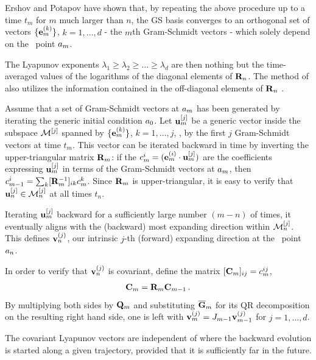 Ershov and Potapov
have shown that, by repeating the above
procedure up to a time $t_m$ for $m$ much larger than $n$,
the GS basis converges to an orthogonal set of vectors
$\{{\bf e}_m^{(k)}\}$, $k=1,\ldots, d$ - the $m$th Gram-Schmidt
vectors - which solely depend on the \statesp\ point
$a_{m}$.

The Lyapunov exponents $\lambda_1 \geq \lambda_2 \geq \ldots \geq \lambda_d$
are then nothing but the time-averaged values of the
logarithms of the diagonal elements of ${\bf R}_n$.
The method of  also utilizes the
information contained in the off-diagonal elements of ${\bf R}_n$ .

Assume that a set of Gram-Schmidt vectors at $a_m$ has
been generated by iterating the generic initial condition
$a_0$. Let ${\bf u}_m^{[j]}$ be a generic vector inside
the subspace ${\cal M}^{[j]}$ spanned by $\{{\bf e}_m^{(k)}\}$,
$k=1,\ldots, j$, \ie, by the first $j$ Gram-Schmidt vectors
at time $t_m$. This vector can be iterated backward in time
by inverting the upper-triangular matrix ${\bf R}_m$: if the
$c_m^{i}=({\bf e}_m^{(i)} \cdot {\bf u}_m^{[j]} )$ are the
coefficients expressing ${\bf u}_m^{[j]}$ in terms of the
Gram-Schmidt vectors at $a_m$, then $c_{m-1}^{i}= \sum_k
[{\bf R}_m^{-1}]_{ik} c_m^{k}$. Since ${\bf R}_m$ is
upper-triangular, it is easy to verify that ${\bf u}_n^{[j]}
\in {\cal M}^{[j]}_n$ at all times $t_n$.


Iterating ${\bf u}_m^{[j]}$ backward for a sufficiently large
number $(m-n)$ of times, it eventually aligns with the
(backward) most expanding direction within ${\cal M}^{[j]}_n$.
This defines  ${\bf v}_n^{(j)}$, our intrinsic $j$-th
(forward) expanding direction at the \statesp\ point
$a_n$.

In order to verify that ${\bf v}_n^{(j)}$ is covariant,
define the matrix $[{\bf C}_m]_{ij} = c_m^{ij}$,
\[
{\bf C}_m = {\bf R}_m {\bf C}_{m-1}
\,.
\]
By multiplying both sides by ${\bf Q}_m$ and substituting
$\overline {\bf G}_m$ for its QR decomposition on the
resulting right hand side, one is left with ${\bf
v}_{m}^{(j)}=J_{m-1} {\bf v}_{m-1}^{(j)}$ for
$j=1,\ldots, d$.

The covariant Lyapunov vectors are independent of where the
backward evolution is started along a given trajectory,
provided that it is sufficiently far in the future.

